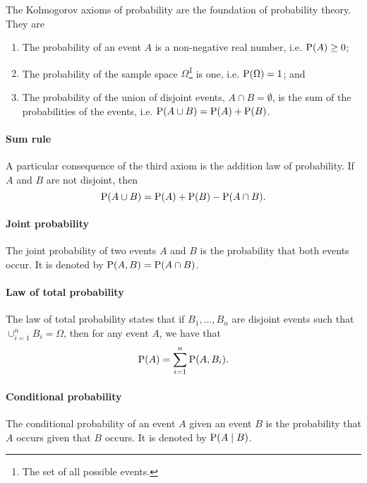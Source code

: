 The Kolmogorov axioms of probability are the foundation of probability theory.
They are
\begin{enumerate}
  \item The probability of an event $A$ is a non-negative real number, i.e. $\operatorname{P}(A) \geq 0$;
  \item The probability of the sample space $\Omega$\footnote{The set of all possible
    events.} is one, i.e. $\operatorname{P}(\Omega) = 1$; and
  \item The probability of the union of disjoint events, $A \cap B = \emptyset$, is
    the sum of the probabilities of the events, i.e. $\operatorname{P}(A \cup B) = \operatorname{P}(A) + \operatorname{P}(B)$.
\end{enumerate}

\paragraph{Sum rule}
A particular consequence of the third axiom is the addition law of probability.
If $A$ and $B$ are not disjoint, then
\begin{equation*}
  \operatorname{P}(A \cup B) = \operatorname{P}(A) + \operatorname{P}(B) - \operatorname{P}(A \cap B)\text{.}
\end{equation*}

\paragraph{Joint probability}

The joint probability of two events $A$ and $B$ is the probability that both events
occur.  It is denoted by $\operatorname{P}(A, B) = \operatorname{P}(A \cap B)$.

\paragraph{Law of total probability}

The law of total probability states that if $B_1, \dots, B_n$ are disjoint events
such that $\cup_{i = 1}^n B_i = \Omega$, then for any event $A$, we have that
$$\operatorname{P}(A) = \sum_{i = 1}^n \operatorname{P}(A, B_i)\text{.}$$

\paragraph{Conditional probability}

The conditional probability of an event $A$ given an event $B$ is the probability
that $A$ occurs given that $B$ occurs.  It is denoted by $\operatorname{P}(A \mid B)$.


